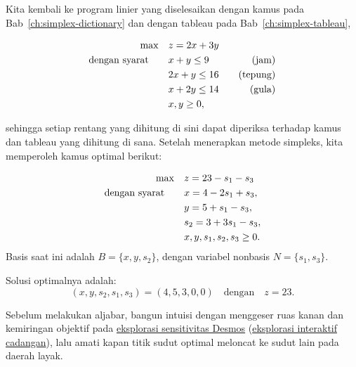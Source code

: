 Kita kembali ke program linier yang diselesaikan dengan kamus pada Bab~\ref{ch:simplex-dictionary} dan dengan tableau pada Bab~\ref{ch:simplex-tableau},
\begin{tcolorbox}[colback=algslate!6, colframe=algslate, coltitle=white, fonttitle=\bfseries, sharp corners,
    title=\textbf{Contoh Utama}]
\[
\begin{aligned}
\max \quad & z = 2x + 3y \\
\mbox{dengan syarat}\quad \quad
& x + y \leq 9 \quad & \mbox{(jam)} \\
& 2x + y \leq 16 \quad & \mbox{(tepung)} \\
& x + 2y \leq 14 \quad & \mbox{(gula)} \\
& x, y \geq 0,
\end{aligned}
\]
\end{tcolorbox}
\noindent sehingga setiap rentang yang dihitung di sini dapat diperiksa terhadap kamus dan tableau yang dihitung di sana. Setelah menerapkan metode simpleks, kita memperoleh kamus optimal berikut:

\begin{tcolorbox}[colback=algopt!6, colframe=algopt, coltitle=white, fonttitle=\bfseries, sharp corners,
    title=\textbf{Kamus Akhir}]
\[
\begin{aligned}
\max \quad
& z = 23 - s_1 - s_3 \\
\mbox{dengan syarat}\quad \quad
& x = 4 - 2s_1 + s_3, \\
& y = 5 + s_1 - s_3, \\
& s_2 = 3 + 3s_1 - s_3, \\
& x, y, s_1, s_2, s_3 \geq 0.
\end{aligned}
\]
Basis saat ini adalah \( B = \{x, y, s_2\} \), dengan variabel nonbasis \( N = \{s_1, s_3\} \).

Solusi optimalnya adalah:
\[
(x, y, s_2, s_1, s_3) = (4, 5, 3, 0, 0) \quad \text{dengan} \quad z = 23.
\]
\end{tcolorbox}

\begin{tcolorbox}[colback=sensbox!6, colframe=sensbox, coltitle=white, fonttitle=\bfseries, sharp corners,
    title={\ding{228}\ Interaktif: geser kendalanya}]
Sebelum melakukan aljabar, bangun intuisi dengan menggeser ruas kanan dan kemiringan objektif pada \href{https://www.desmos.com/calculator/xz1f0tdjf9}{eksplorasi sensitivitas Desmos} (\href{https://open-optimization.github.io/open-optimization-or-book/interactive-figures/lp-sensitivity-explorer.html}{eksplorasi interaktif cadangan}), lalu amati kapan titik sudut optimal meloncat ke sudut lain pada daerah layak.
\end{tcolorbox}

